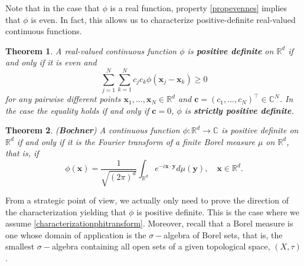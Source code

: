 \documentclass[12pt]{report} %
\newtheorem{theorem}{Theorem}
\newcommand{\tmmathbf}[1]{\ensuremath{\boldsymbol{#1}}}
\newcommand{\tmstrong}[1]{\textbf{#1}}
\begin{document}
Note that in the case that $\phi$ is a real function, property
\eqref{propevennes} implies that $\phi$ is even. In fact, this allows us to
characterize positive-definite real-valued continuous functions.

\begin{theorem}
  A real-valued continuous function $\phi$ is {\tmstrong{positive definite}}
  on $\mathbb{R}^d$ if and only if it is even and
  \[ \sum_{j = 1}^N \sum_{k = 1}^N c_j c_k \phi (\tmmathbf{x}_j
     -\tmmathbf{x}_k) \geq 0 \]
  for any pairwise different points $\tmmathbf{x}_1, \ldots, \tmmathbf{x}_N
  \in \mathbb{R}^d$ and $\tmmathbf{c}= (c_1, \ldots, c_N)^{\top} \in
  \mathbb{C}^N$. In the case the equality holds if and only if $\tmmathbf{c}=
  0$, $\phi$ is {\tmstrong{strictly positive definite}}.
\end{theorem}

\begin{theorem}\label{tm-bochner}
  ({\tmstrong{Bochner}}) A continuous function $\phi : \mathbb{R}^d
  \rightarrow \mathbb{C}$ is positive definite on $\mathbb{R}^d$ if and only
  if it is the Fourier transform of a finite Borel measure $\mu$
  on $\mathbb{R}^d$, that is, if
  \begin{equation}
    \phi (\tmmathbf{x}) = \frac{1}{\sqrt{(2 \pi)^d}} \int_{\mathbb{R}^d} e^{-
    i\tmmathbf{x} \cdot \tmmathbf{y}} d \mu (\tmmathbf{y}), \quad \tmmathbf{x}
    \in \mathbb{R}^d . \label{characterizationphitransform}
  \end{equation}
\end{theorem}

From a strategic point of view, we actually only need to prove the direction of the characterization yielding that $\phi$ is positive definite. This is the case where we assume \eqref{characterizationphitransform}. Moreover, recall that a Borel measure is one whose domain of application is the $\sigma-$algebra of Borel sets, that is, the smallest $\sigma-$algebra containing all open sets of a given topological space, $(X,\tau)$. 
\end{document}
